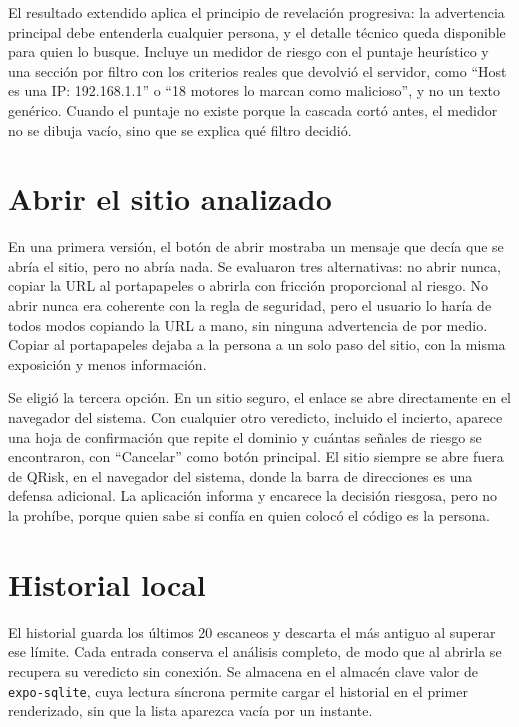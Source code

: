 El resultado extendido aplica el principio de revelación progresiva: la advertencia principal debe entenderla cualquier persona, y el detalle técnico queda disponible para quien lo busque. Incluye un medidor de riesgo con el puntaje heurístico y una sección por filtro con los criterios reales que devolvió el servidor, como ``Host es una IP: 192.168.1.1'' o ``18 motores lo marcan como malicioso'', y no un texto genérico. Cuando el puntaje no existe porque la cascada cortó antes, el medidor no se dibuja vacío, sino que se explica qué filtro decidió.

\section{Abrir el sitio analizado}

En una primera versión, el botón de abrir mostraba un mensaje que decía que se abría el sitio, pero no abría nada. Se evaluaron tres alternativas: no abrir nunca, copiar la URL al portapapeles o abrirla con fricción proporcional al riesgo. No abrir nunca era coherente con la regla de seguridad, pero el usuario lo haría de todos modos copiando la URL a mano, sin ninguna advertencia de por medio. Copiar al portapapeles dejaba a la persona a un solo paso del sitio, con la misma exposición y menos información.

Se eligió la tercera opción. En un sitio seguro, el enlace se abre directamente en el navegador del sistema. Con cualquier otro veredicto, incluido el incierto, aparece una hoja de confirmación que repite el dominio y cuántas señales de riesgo se encontraron, con ``Cancelar'' como botón principal. El sitio siempre se abre fuera de QRisk, en el navegador del sistema, donde la barra de direcciones es una defensa adicional. La aplicación informa y encarece la decisión riesgosa, pero no la prohíbe, porque quien sabe si confía en quien colocó el código es la persona.

\section{Historial local}

El historial guarda los últimos 20 escaneos y descarta el más antiguo al superar ese límite. Cada entrada conserva el análisis completo, de modo que al abrirla se recupera su veredicto sin conexión. Se almacena en el almacén clave valor de \texttt{expo-sqlite}, cuya lectura síncrona permite cargar el historial en el primer renderizado, sin que la lista aparezca vacía por un instante.

